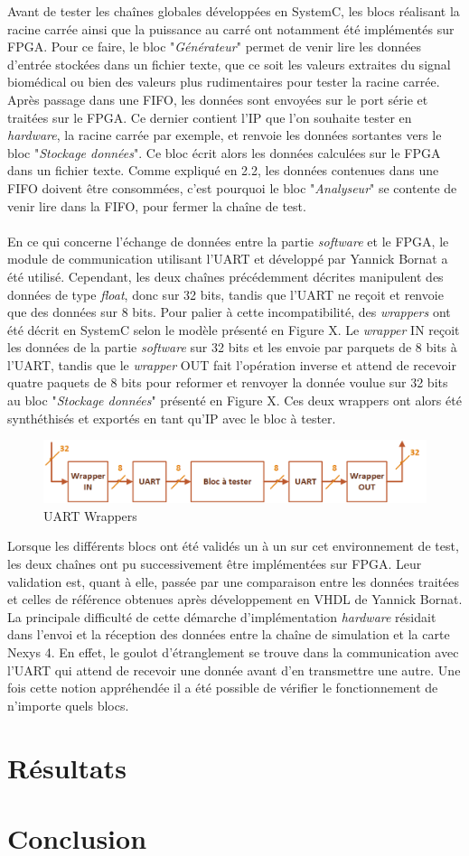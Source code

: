 \documentclass[a4paper,12pt]{article}
\begin{document}
	Avant de tester les chaînes globales développées en SystemC, les blocs réalisant la racine carrée ainsi que la puissance au carré ont notamment été implémentés sur FPGA. Pour ce faire, le bloc "\textit{Générateur}" permet de venir lire les données d'entrée stockées dans un fichier texte, que ce soit les valeurs extraites du signal biomédical ou bien des valeurs plus rudimentaires pour tester la racine carrée. Après passage dans une FIFO, les données sont envoyées sur le port série et traitées sur le FPGA. Ce dernier contient l'IP que l'on souhaite tester en \textit{hardware}, la racine carrée par exemple, et renvoie les données sortantes vers le bloc "\textit{Stockage données}". Ce bloc écrit alors les données calculées sur le FPGA dans un fichier texte. Comme expliqué en 2.2, les données contenues dans une FIFO doivent être consommées, c'est pourquoi le bloc "\textit{Analyseur}" se contente de venir lire dans la FIFO, pour fermer la chaîne de test.  \\ \\
	\indent En ce qui concerne l'échange de données entre la partie \textit{software} et le FPGA, le module de communication utilisant l'UART et développé par Yannick Bornat a été utilisé. Cependant, les deux chaînes précédemment décrites manipulent des données de type \textit{float}, donc sur 32 bits, tandis que l'UART ne reçoit et renvoie que des données sur 8 bits. Pour palier à cette incompatibilité, des \textit{wrappers} ont été décrit en SystemC selon le modèle présenté en Figure X. Le \textit{wrapper} IN reçoit les données de la partie \textit{software} sur 32 bits et les envoie par parquets de 8 bits à l'UART, tandis que le \textit{wrapper} OUT fait l'opération inverse et attend de recevoir quatre paquets de 8 bits pour reformer et renvoyer la donnée voulue sur 32 bits au bloc "\textit{Stockage données}" présenté en Figure X. Ces deux wrappers ont alors été synthéthisés et exportés en tant qu'IP avec le bloc à tester.  
	\begin{figure}[H]
		\centering
		\includegraphics[width=\textwidth]{Dessin7.png}
		\caption{UART Wrappers}
	\end{figure}   

	Lorsque les différents blocs ont été validés un à un sur cet environnement de test, les deux chaînes ont pu successivement être implémentées sur FPGA. Leur validation est, quant à elle, passée par une comparaison entre les données traitées et celles de référence obtenues après développement en VHDL de Yannick Bornat. La principale difficulté de cette démarche d'implémentation \textit{hardware} résidait dans l'envoi et la réception des données entre la chaîne de simulation et la carte Nexys 4. En effet, le goulot d'étranglement se trouve dans la communication avec l'UART qui attend de recevoir une donnée avant d'en transmettre une autre. Une fois cette notion appréhendée il a été possible de vérifier le fonctionnement de n'importe quels blocs.
\newpage
\section{Résultats}
\newpage
\section{Conclusion}
\end{document}

